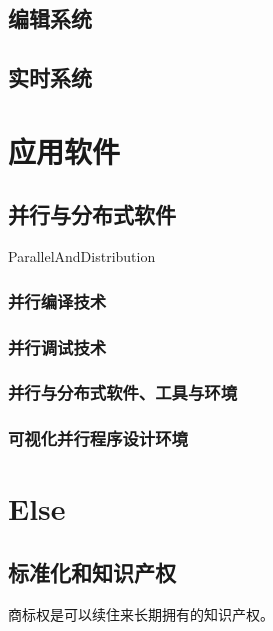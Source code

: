 \documentclass[UTF8]{../computerUniverse}
\begin{document}
\section{编辑系统}

\section{实时系统}


\chapter{应用软件}

\section{并行与分布式软件}
ParallelAndDistribution
\subsection{并行编译技术}
\subsection{并行调试技术}
\subsection{并行与分布式软件、工具与环境}
\subsection{可视化并行程序设计环境}







\chapter{Else}


\section{标准化和知识产权}

商标权是可以续住来长期拥有的知识产权。
\end{document}
